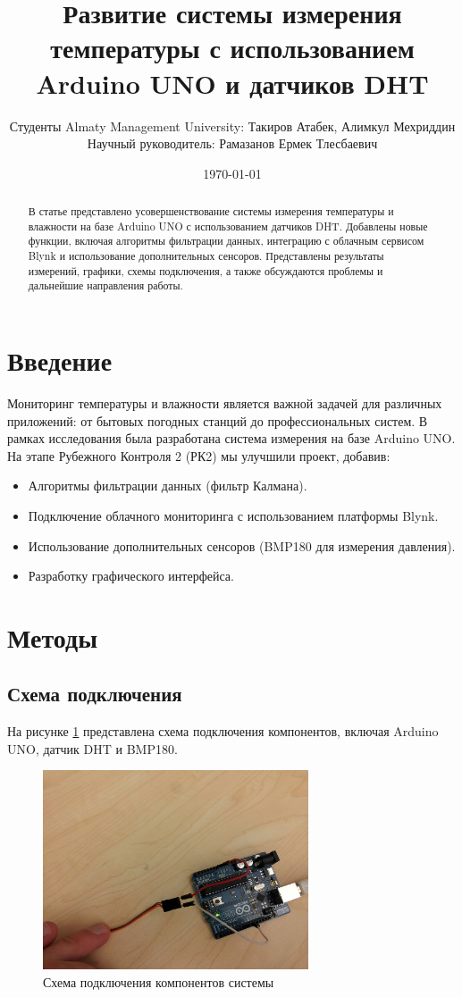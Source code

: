 \documentclass[a4paper,12pt]{article}
\title{Развитие системы измерения температуры с использованием Arduino UNO и датчиков DHT}
\author{Студенты Almaty Management University: Такиров Атабек, Алимкул Мехриддин \\ Научный руководитель: Рамазанов Ермек Тлесбаевич}
\date{\today}
\begin{document}
\maketitle

\begin{abstract}
В статье представлено усовершенствование системы измерения температуры и влажности на базе Arduino UNO с использованием датчиков DHT. Добавлены новые функции, включая алгоритмы фильтрации данных, интеграцию с облачным сервисом Blynk и использование дополнительных сенсоров. Представлены результаты измерений, графики, схемы подключения, а также обсуждаются проблемы и дальнейшие направления работы.
\end{abstract}

\section{Введение}
Мониторинг температуры и влажности является важной задачей для различных приложений: от бытовых погодных станций до профессиональных систем. В рамках исследования была разработана система измерения на базе Arduino UNO. На этапе Рубежного Контроля 2 (РК2) мы улучшили проект, добавив:
\begin{itemize}
    \item Алгоритмы фильтрации данных (фильтр Калмана).
    \item Подключение облачного мониторинга с использованием платформы Blynk.
    \item Использование дополнительных сенсоров (BMP180 для измерения давления).
    \item Разработку графического интерфейса.
\end{itemize}

\section{Методы}
\subsection{Схема подключения}
На рисунке \ref{fig:setup} представлена схема подключения компонентов, включая Arduino UNO, датчик DHT и BMP180. 

\begin{figure}[H]
    \centering
    \includegraphics[width=0.7\textwidth]{arduino_setup.jpg}
    \caption{Схема подключения компонентов системы}
    \label{fig:setup}
\end{figure}
\end{document}
